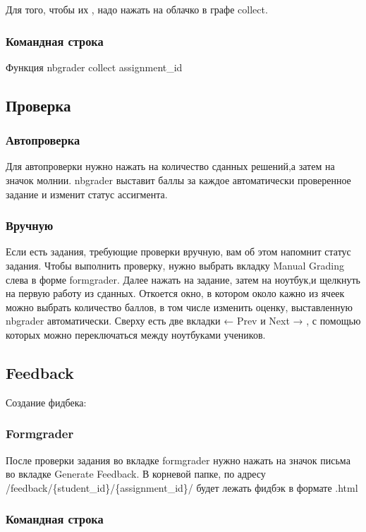 \documentclass[a4paper,12pt]{article}
\begin{document}
Для того, чтобы их \grqq, надо нажать на облачко в графе collect.

\subsubsection{Командная строка}

Функция nbgrader collect {assignment\_id}

\subsection{Проверка}

\subsubsection{Автопроверка}

Для автопроверки нужно нажать на количество сданных решений,а затем на значок молнии. nbgrader выставит баллы за каждое автоматически проверенное задание и изменит статус ассигмента. 
\subsubsection{Вручную}

Если есть задания, требующие проверки вручную, вам об этом напомнит статус задания. Чтобы выполнить проверку, нужно выбрать вкладку Manual Grading слева в форме formgrader. Далее нажать на задание, затем на ноутбук,и щелкнуть на первую работу из сданных. Откоется окно, в котором около кажно из ячеек можно выбрать количество баллов, в том числе изменить оценку, выставленную nbgrader автоматически. Сверху есть две вкладки ← Prev и Next → , с помощью которых можно переключаться между ноутбуками учеников.
\subsection{Feedback}

Создание фидбека:

\subsubsection{Formgrader}

После проверки задания во вкладке formgrader нужно нажать на значок письма во вкладке Generate Feedback. В корневой папке, по адресу /feedback/\{student\_id\}/\{assignment\_id\}/ будет лежать фидбэк в формате .html
\subsubsection{Командная строка}
\end{document}
